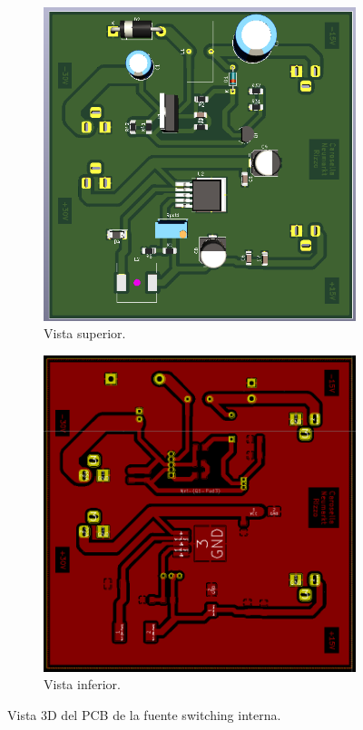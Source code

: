 \begin{figure}[H]
\centering
\begin{subfigure}{0.5\textwidth}
        \centering
    \includegraphics[width = 0.95 \textwidth]{img/fuente/fuente_switching_3D.PNG}
        \caption{Vista superior.}
        \label{fig::fuente_3D_T}
\end{subfigure}%
\begin{subfigure}{0.5\textwidth}
        \centering
    \includegraphics[width = 0.95 \textwidth]{img/fuente/fuente_switching.PNG}
        \caption{Vista inferior.}
        \label{fig::fuente_3D_B}
\end{subfigure}
\caption{Vista 3D del PCB de la fuente switching interna.}
\label{fig:fuente_3D}
\end{figure}



